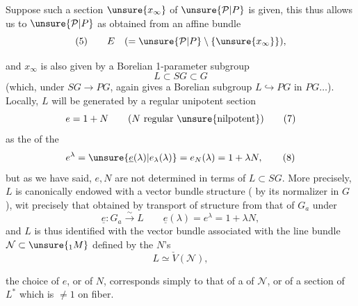 Suppose such a section $\unsure{x_\infty}$ of $\unsure{\mathcal P|P}$ is given, this thus allows us to   $\unsure{\mathcal P|P}$ as obtained from an affine  bundle
\[
(5)\qquad E\quad(=\unsure{\mathcal P|P}\setminus\{\unsure{x_\infty}\}),
\]



and $x_\infty$ is also given by a Borelian 1-parameter subgroup
\[
L\subset SG\subset G \tag{6}
\]
(which, under $SG\longrightarrow PG$, again gives a Borelian  subgroup $L\hookrightarrow PG$ in $PG\ldots$). Locally, $L$ will be generated by a regular unipotent section
\[
e=1+N\qquad (N\text{ regular \unsure{nilpotent}}) \tag{7}
\]
as the  of the
\[
e^\lambda=\unsure{\underline e(\lambda)|e_{\lambda}(\lambda)}=e_N(\lambda)=1+\lambda N, \tag{8}
\]
but as we have said, $e,N$ are not determined  in terms of $L\subset SG$. More precisely, $L$ is canonically endowed with a vector bundle structure ( by its normalizer in $G$),   wit precisely that obtained by transport of structure from that of $G_a$ under
\[
\underline e:G_a\xrightarrow{\sim}L\qquad
\underline e(\lambda)=e^\lambda=1+\lambda N,
\]
and  $L$ is thus identified with the vector bundle  associated with the line bundle $\mathcal N\subset\unsure{{}_1M}$  defined by the $N$'s
\[
L\simeq\check V(\mathcal N), \tag{9}
\]


the choice of $e$, or of $N$, corresponds simply to that of a   of $\mathcal N$, or of a section  of $L^*$   which is $\ne1$ on  fiber.



